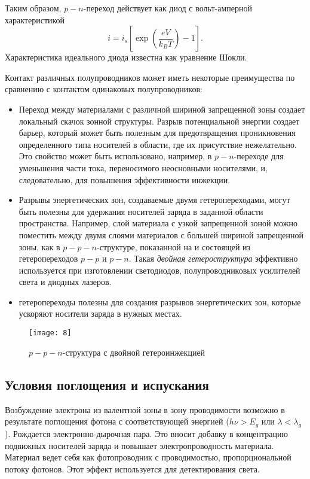 \documentclass[a4paper, 12pt]{article}
\begin{document}
Таким образом, $p-n$-переход действует как диод с вольт-амперной
характеристикой 
\begin{equation}
    i=i_{s} \left[\exp \left( \frac{eV}{k_{B}T}\right)-1\right].
    \label{eq:diod}
\end{equation}
Характеристика идеального диода известна как уравнение Шокли.

Контакт различных полупроводников может иметь некоторые преимущества по
сравнению с контактом одинаковых полупроводников:
\begin{itemize}
    \item Переход между материалами с различной шириной запрещенной
        зоны создает локальный скачок зонной структуры. Разрыв
        потенциальной энергии создает барьер, который может быть
        полезным для предотвращения проникновения определенного типа
        носителей в области, где их присутствие нежелательно. Это
        свойство может быть использовано, например, в $p-n$-переходе
        для уменьшения части тока, переносимого неосновными
        носителями, и, следовательно, для повышения эффективности
        инжекции.
    \item Разрывы энергетических зон, создаваемые двумя
        гетеропереходами, могут быть полезны для удержания носителей
        заряда в заданной области пространства. Например, слой
        материала с узкой запрещенной зоной можно поместить между
        двумя слоями материалов с большей шириной запрещенной зоны,
        как в $p-p-n$-структуре, показанной на  и состоящей
        из гетеропереходов $p-p$ и $p-n$. Такая \emph{двойная
        гетероструктура}  эффективно используется при изготовлении
        светодиодов, полупроводниковых усилителей света и диодных
        лазеров.
    \item гетеропереходы полезны для создания разрывов энергетических
        зон, которые ускоряют носители заряда в нужных местах.
\end{itemize}


\begin{figure}[H]
    \texttt{[image: 8]} 
    \caption{$p-p-n$-структура с двойной гетероинжекцией}
    \label{fig:8}
\end{figure}






\subsection{Условия поглощения и испускания}
Возбуждение электрона из валентной зоны в зону проводимости
возможно в результате поглощения фотона с соответствующей энергией
($h\nu>E_{g}$ или $\lambda < \lambda_{g}$). Рождается
электронно-дырочная пара. Это вносит добавку в концентрацию подвижных
носителей заряда и повышает электропроводность материала. Материал
ведет себя как фотопроводник с проводимостью, пропорциональной потоку
фотонов. Этот эффект используется для детектирования света.
\end{document}
